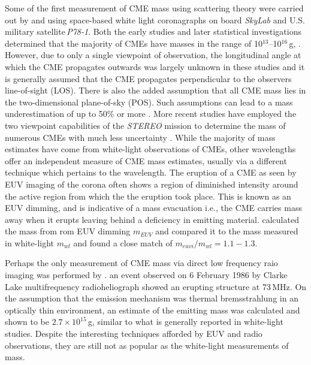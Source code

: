 Some of the first measurement of CME mass using scattering theory were carried out by \citet{munro1979} and \citet{poland1981} using space-based  white light coronagraphs on board \emph{SkyLab} and U.S. military satellite\,\emph{P78-1}.  Both the early studies and later statistical investigations determined that the majority of CMEs have masses in the range of 10$^{13}$--10$^{16}$\,g, \citep{vourlidas02, vour2010}. However, due to only a single viewpoint of observation, the longitudinal angle at which the CME propagates outwards was largely unknown in these studies and it is generally assumed that the CME propagates perpendicular to the observers line-of-sight (LOS). There is also the added assumption that all CME mass lies in the two-dimensional plane-of-sky (POS). Such assumptions can lead to a mass underestimation of up to 50\% or more \citep{vou00}. More recent studies have employed the two viewpoint capabilities of the \emph{STEREO} mission to determine the mass of numerous CMEs with much less uncertainty \citep{cola09}. While the majority of mass estimates have come from white-light observations of CMEs, other wavelengths offer an independent measure of CME mass estimates, usually via a different technique which pertains to the wavelength. The eruption of a CME as seen by EUV imaging of the corona often shows a region of diminished intensity around the active region from which the the eruption took place. This is known as an EUV dimming, and is indicative of a mass evacuation i.e., the CME carries mass away when it erupts leaving behind a deficiency in emitting material.  
\citet{aschw09} calculated the mass from rom EUV dimming $m_{EUV}$ and compared it to the mass measured in white-light $m_{wl}$ and found a close match of $m_{euvi}/m_{wl}=1.1 -1.3$. 

Perhaps the only measurement of CME mass via direct low frequency raio imaging was performed by \citet{gopalswamy1992}. an event observed on 6 February 1986 by Clarke Lake multifrequency radioheliograph showed an erupting structure at 73\,MHz. On the assumption that the emission mechanism was thermal bremsstrahlung in an optically thin environment, an estimate of the emitting mass was calculated and shown to be $2.7\times10^{15}$\,g, similar to what is generally reported in white-light studies. Despite the interesting techniques afforded by EUV and radio observations, they are still not as popular as the white-light measurements of mass.


